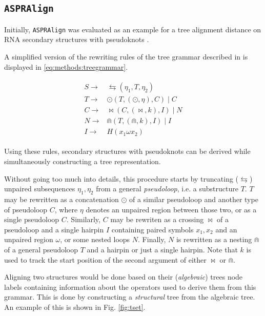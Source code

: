 \documentclass[../../master.tex]{subfiles}
\begin{document}
\subsection{\texttt{ASPRAlign}}
\label{sub:appendix:aspra}

Initially, \texttt{ASPRAlign} was evaluated as an example for a tree alignment distance on RNA secondary structures with pseudoknots \parencite{quadrini_algebraic_2019}.

A simplified version of the rewriting rules of the tree grammar described in \parencite{quadrini_algebraic_2019} is displayed in \eqref{eq:methods:treegrammar}.

\begin{align}\label{eq:methods:treegrammar}
	\begin{split}
		S \rightarrow &\leftrightarrows(\eta_1, T, \eta_2) \\
		T \rightarrow &\odot(T, (\odot, \eta), C) \mid C \\ 
		C \rightarrow &\bowtie(C, (\bowtie, k), I) \mid N \\
		N \rightarrow &\Cap(T, (\Cap, k), I) \mid I \\
		I \rightarrow & H (x_1 \omega x_2)
	\end{split}
\end{align}

Using these rules, secondary structures with pseudoknots can be derived while simultaneously constructing a tree representation.

Without going too much into details, this procedure starts by truncating ($\leftrightarrows$) unpaired subsequences $\eta_1, \eta_2$ from a general \textit{pseudoloop}, i.e. a substructure $T$. $T$ may be rewritten as a concatenation $\odot$ of a similar pseudoloop and another type of pseudoloop $C$, where $\eta$ denotes an unpaired region between those two, or as a single pseudoloop $C$.
Similarly, $C$ may be rewriten as a crossing $\bowtie$  of a pseudoloop and a single hairpin $I$ containing paired symbols $x_1, x_2$ and an unpaired region $\omega$, or some nested loops $N$.
Finally, $N$ is rewritten as a nesting $\Cap$ of a general pseudoloop $T$ and a hairpin or just a single hairpin.
Note that $k$ is used to track the start position of the second argument of either $\bowtie$ or $\Cap$. 

Aligning two structures would be done based on their (\textit{algebraic}) trees node labels containing information about the operators used to derive them from this grammar.
This is done by constructing a \textit{structural} tree from the algebraic tree. An example of this is shown in Fig. \ref{fig:tset}.
\end{document}
